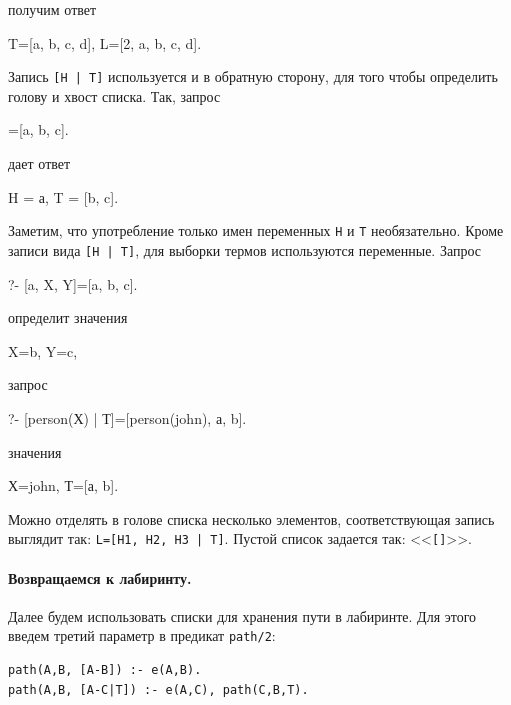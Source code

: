\documentclass[a4paper,14pt, openany, twoside, final]{extbook} %
\begin{document}
\noindent получим ответ

\begin{proexp}
T=[a, b, c, d], L=[2, a, b, c, d].
\end{proexp}

  Запись {\tt [Н | Т]} используется и в обратную сторону, для того чтобы определить голову и хвост списка.  Так, запрос

\begin{proexp}
[H | T]=[a, b, c].
\end{proexp}

\noindent дает ответ

\begin{proexp}
H = а, T = [b, c].
\end{proexp}


Заметим, что употребление только имен переменных {\tt Н} и {\tt Т} необязательно.  Кроме записи вида {\tt [H | T]}, для выборки термов используются переменные. Запрос

\begin{proexp}
?- [a, X, Y]=[a, b, c].
\end{proexp}

\noindent определит значения

\begin{proexp}
X=b, Y=c,
\end{proexp}

\noindent запрос

\begin{proexp}
?- [person(Х) | Т]=[person(john), а, b].
\end{proexp}

\noindent значения

\begin{proexp}
Х=john, Т=[а, b].
\end{proexp}

  Можно отделять в голове списка несколько элементов, соответствующая запись выглядит так: {\tt L=[H1, H2, H3 | T]}.  Пустой список задается так: <<\texttt{[]}>>.

\paragraph{Возвращаемся к лабиринту.} \label{par:mazelist} Далее будем использовать списки для хранения пути в лабиринте.  Для этого введем третий параметр в предикат \texttt{path/2}:

\begin{verbatim}
path(A,B, [A-B]) :- e(A,B).
path(A,B, [A-C|T]) :- e(A,C), path(C,B,T).
\end{verbatim}
\end{document}
